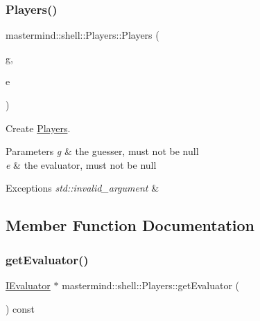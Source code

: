 \subsubsection{\texorpdfstring{Players()}{Players()}}
{\footnotesize\ttfamily mastermind\+::shell\+::\+Players\+::\+Players (\begin{DoxyParamCaption}\item[{\hyperlink{classmastermind_1_1logic_1_1_i_guesser}{I\+Guesser} $\ast$}]{g,  }\item[{\hyperlink{classmastermind_1_1logic_1_1_i_evaluator}{I\+Evaluator} $\ast$}]{e }\end{DoxyParamCaption})}



Create \hyperlink{classmastermind_1_1shell_1_1_players}{Players}. 


\begin{DoxyParams}{Parameters}
{\em g} & the guesser, must not be {\ttfamily null} \\
\hline
{\em e} & the evaluator, must not be {\ttfamily null}\\
\hline
\end{DoxyParams}

\begin{DoxyExceptions}{Exceptions}
{\em std\+::invalid\+\_\+argument} & \\
\hline
\end{DoxyExceptions}


\subsection{Member Function Documentation}
\hypertarget{classmastermind_1_1shell_1_1_players_a98685816e9b68a6131c6694cf685ac40}{}\label{classmastermind_1_1shell_1_1_players_a98685816e9b68a6131c6694cf685ac40} 
\subsubsection{\texorpdfstring{get\+Evaluator()}{getEvaluator()}}
{\footnotesize\ttfamily \hyperlink{classmastermind_1_1logic_1_1_i_evaluator}{I\+Evaluator} $\ast$ mastermind\+::shell\+::\+Players\+::get\+Evaluator (\begin{DoxyParamCaption}{ }\end{DoxyParamCaption}) const}




